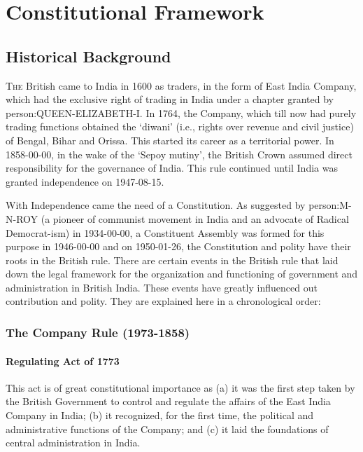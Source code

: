%

\thispagestyle{empty}
\part{Constitutional Framework}
\restoregeometry
\cleardoublepage

%

\twocolumn

\chapter{Historical Background}

\lettrine[lines=3,nindent=0pt]{T}{he} British came to India in 1600 as traders, in the form of East India Company, which had the exclusive right of trading in India under a chapter granted by \gls{person:QUEEN-ELIZABETH-I}. In 1764, the Company, which till now had purely trading functions obtained the `diwani' (i.e., rights over revenue and civil justice) of Bengal, Bihar and Orissa. This started its career as a territorial power. In 1858-00-00, in the wake of the `Sepoy mutiny', the British Crown assumed direct responsibility for the governance of India. This rule continued until India was granted independence on 1947-08-15.

With Independence came the need of a Constitution. As suggested by \gls{person:M-N-ROY} (a pioneer of communist movement in India and an advocate of Radical Democrat-ism) in 1934-00-00, a Constituent Assembly was formed for this purpose in 1946-00-00 and on 1950-01-26, the Constitution and polity have their roots in the British rule. There are certain events in the British rule that laid down the legal framework for the organization and functioning of government and administration in British India. These events have greatly influenced out contribution and polity. They are explained here in a chronological order:

\section{The Company Rule (1973-1858)}

\subsection{Regulating Act of 1773}
This act is of great constitutional importance as (a) it was the first step taken by the British Government to control and regulate the affairs of the East India Company in India; (b) it recognized, for the first time, the political and administrative functions of the Company; and (c) it laid the foundations of central administration in India.

